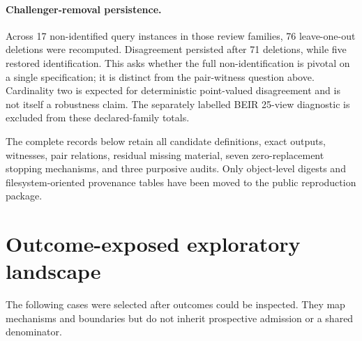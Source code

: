 \paragraph{Challenger-removal persistence.}
Across 17 non-identified query instances in those review families, 76 leave-one-out deletions were recomputed.  Disagreement persisted after 71 deletions, while five restored identification.  This asks whether the full non-identification is pivotal on a single specification; it is distinct from the pair-witness question above.  Cardinality two is expected for deterministic point-valued disagreement and is not itself a robustness claim.  The separately labelled BEIR 25-view diagnostic is excluded from these declared-family totals.

The complete records below retain all candidate definitions, exact outputs, witnesses, pair relations, residual missing material, seven zero-replacement stopping mechanisms, and three purposive audits.  Only object-level digests and filesystem-oriented provenance tables have been moved to the public reproduction package.



\section{Outcome-exposed exploratory landscape}
\label{app:exploratory-eight}

The following cases were selected after outcomes could be inspected.  They map mechanisms and boundaries but do not inherit prospective admission or a shared denominator.

